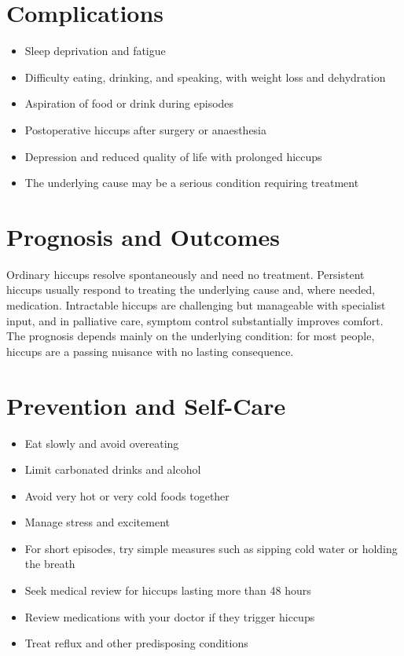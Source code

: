\section*{Complications}
\begin{itemize}
    \item Sleep deprivation and fatigue
    \item Difficulty eating, drinking, and speaking, with weight loss and dehydration
    \item Aspiration of food or drink during episodes
    \item Postoperative hiccups after surgery or anaesthesia
    \item Depression and reduced quality of life with prolonged hiccups
    \item The underlying cause may be a serious condition requiring treatment
\end{itemize}

\section*{Prognosis and Outcomes}
Ordinary hiccups resolve spontaneously and need no treatment. Persistent hiccups usually respond to treating the underlying cause and, where needed, medication. Intractable hiccups are challenging but manageable with specialist input, and in palliative care, symptom control substantially improves comfort. The prognosis depends mainly on the underlying condition: for most people, hiccups are a passing nuisance with no lasting consequence.

\section*{Prevention and Self-Care}
\begin{itemize}
    \item Eat slowly and avoid overeating
    \item Limit carbonated drinks and alcohol
    \item Avoid very hot or very cold foods together
    \item Manage stress and excitement
    \item For short episodes, try simple measures such as sipping cold water or holding the breath
    \item Seek medical review for hiccups lasting more than 48 hours
    \item Review medications with your doctor if they trigger hiccups
    \item Treat reflux and other predisposing conditions
\end{itemize}

